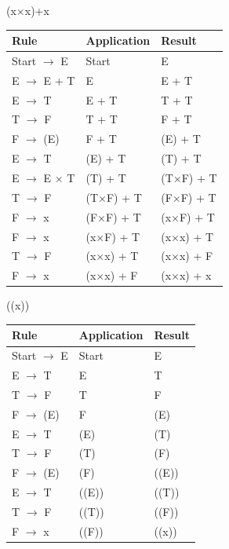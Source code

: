 \documentclass[a4paper]{article}
\begin{document}
\begin{enumerate}
\begin{enumerate}
      (x$\times$x)+x \\
      \begin{tabular}{ |l|l|l| } \hline
        Rule & Application & Result \\ \hline
        Start $\rightarrow$ E & Start & E \\ \hline
        E $\rightarrow$ E + T & E & E + T \\ \hline
        E $\rightarrow$ T & E + T & T + T \\ \hline
        T $\rightarrow$ F & T + T & F + T \\ \hline
        F $\rightarrow$ (E) & F + T & (E) + T \\ \hline
        E $\rightarrow$ T & (E) + T & (T) + T \\ \hline
        E $\rightarrow$ E $\times$ T & (T) + T & (T$\times$F) + T \\ \hline
        T $\rightarrow$ F & (T$\times$F) + T & (F$\times$F) + T \\ \hline
        F $\rightarrow$ x & (F$\times$F) + T & (x$\times$F) + T \\ \hline
        F $\rightarrow$ x & (x$\times$F) + T & (x$\times$x) + T \\ \hline
        T $\rightarrow$ F & (x$\times$x) + T & (x$\times$x) + F \\ \hline
        F $\rightarrow$ x & (x$\times$x) + F & (x$\times$x) + x \\ \hline
      \end{tabular}
      \vspace{1cm}
      
      ((x)) \\
      \begin{tabular}{ |l|l|l| } \hline
        Rule & Application & Result \\ \hline
        Start $\rightarrow$ E & Start & E \\ \hline
        E $\rightarrow$ T & E & T \\ \hline
        T $\rightarrow$ F & T & F \\ \hline
        F $\rightarrow$ (E) & F & (E) \\ \hline
        E $\rightarrow$ T & (E) & (T) \\ \hline
        T $\rightarrow$ F & (T) & (F) \\ \hline
        F $\rightarrow$ (E) & (F) & ((E)) \\ \hline
        E $\rightarrow$ T & ((E)) & ((T)) \\ \hline
        T $\rightarrow$ F & ((T)) & ((F)) \\ \hline
        F $\rightarrow$ x & ((F)) & ((x)) \\ \hline
      \end{tabular}


    \end{enumerate}


  \end{enumerate}
\end{document}
